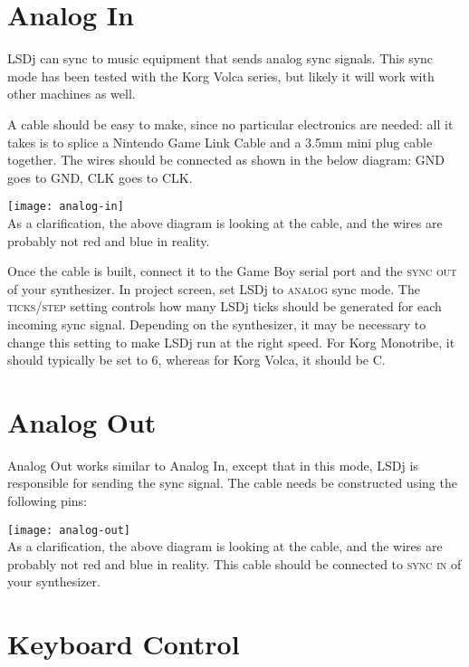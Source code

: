 \section{Analog In}

LSDj can sync to music equipment that sends analog sync signals. This sync mode has been tested with the Korg Volca series, but likely it will work with other machines as well.

A cable should be easy to make, since no particular electronics are needed: all it takes is to splice a Nintendo Game Link Cable and a 3.5mm mini plug cable together. The wires should be connected as shown in the below diagram: GND goes to GND, CLK goes to CLK.

\texttt{[image: analog-in]}\\

As a clarification, the above diagram is looking at the cable, and the wires are probably not red and blue in reality.

Once the cable is built, connect it to the Game Boy serial port and the \textsc{sync out} of your synthesizer. In project screen, set LSDj to \textsc{analog} sync mode. The \textsc{ticks/step} setting controls how many LSDj ticks should be generated for each incoming sync signal. Depending on the synthesizer, it may be necessary to change this setting to make LSDj run at the right speed. For Korg Monotribe, it should typically be set to 6, whereas for Korg Volca, it should be C.

\section{Analog Out}

Analog Out works similar to Analog In, except that in this mode, LSDj is responsible for sending the sync signal. The cable needs be constructed using the following pins:

\texttt{[image: analog-out]}\\

As a clarification, the above diagram is looking at the cable, and the wires are probably not red and blue in reality. This cable should be connected to \textsc{sync in} of your synthesizer.

\section{Keyboard Control}

